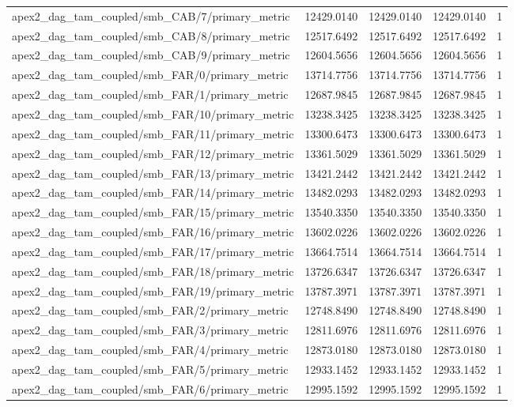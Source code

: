 \begin{table}[h]
\begin{tabular}{lrrrr}
apex2_dag_tam_coupled/smb_CAB/7/primary_metric & 12429.0140 & 12429.0140 & 12429.0140 & 1 \\
apex2_dag_tam_coupled/smb_CAB/8/primary_metric & 12517.6492 & 12517.6492 & 12517.6492 & 1 \\
apex2_dag_tam_coupled/smb_CAB/9/primary_metric & 12604.5656 & 12604.5656 & 12604.5656 & 1 \\
apex2_dag_tam_coupled/smb_FAR/0/primary_metric & 13714.7756 & 13714.7756 & 13714.7756 & 1 \\
apex2_dag_tam_coupled/smb_FAR/1/primary_metric & 12687.9845 & 12687.9845 & 12687.9845 & 1 \\
apex2_dag_tam_coupled/smb_FAR/10/primary_metric & 13238.3425 & 13238.3425 & 13238.3425 & 1 \\
apex2_dag_tam_coupled/smb_FAR/11/primary_metric & 13300.6473 & 13300.6473 & 13300.6473 & 1 \\
apex2_dag_tam_coupled/smb_FAR/12/primary_metric & 13361.5029 & 13361.5029 & 13361.5029 & 1 \\
apex2_dag_tam_coupled/smb_FAR/13/primary_metric & 13421.2442 & 13421.2442 & 13421.2442 & 1 \\
apex2_dag_tam_coupled/smb_FAR/14/primary_metric & 13482.0293 & 13482.0293 & 13482.0293 & 1 \\
apex2_dag_tam_coupled/smb_FAR/15/primary_metric & 13540.3350 & 13540.3350 & 13540.3350 & 1 \\
apex2_dag_tam_coupled/smb_FAR/16/primary_metric & 13602.0226 & 13602.0226 & 13602.0226 & 1 \\
apex2_dag_tam_coupled/smb_FAR/17/primary_metric & 13664.7514 & 13664.7514 & 13664.7514 & 1 \\
apex2_dag_tam_coupled/smb_FAR/18/primary_metric & 13726.6347 & 13726.6347 & 13726.6347 & 1 \\
apex2_dag_tam_coupled/smb_FAR/19/primary_metric & 13787.3971 & 13787.3971 & 13787.3971 & 1 \\
apex2_dag_tam_coupled/smb_FAR/2/primary_metric & 12748.8490 & 12748.8490 & 12748.8490 & 1 \\
apex2_dag_tam_coupled/smb_FAR/3/primary_metric & 12811.6976 & 12811.6976 & 12811.6976 & 1 \\
apex2_dag_tam_coupled/smb_FAR/4/primary_metric & 12873.0180 & 12873.0180 & 12873.0180 & 1 \\
apex2_dag_tam_coupled/smb_FAR/5/primary_metric & 12933.1452 & 12933.1452 & 12933.1452 & 1 \\
apex2_dag_tam_coupled/smb_FAR/6/primary_metric & 12995.1592 & 12995.1592 & 12995.1592 & 1 \\

\end{tabular}
\end{table}
